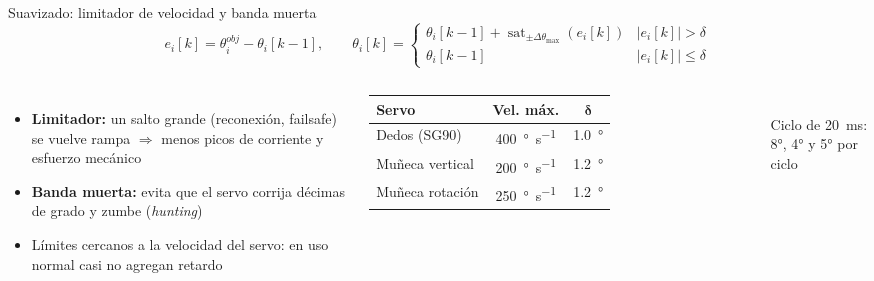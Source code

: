 \documentclass[aspectratio=169,10pt]{beamer}
\begin{document}
\begin{frame}{Suavizado: limitador de velocidad y banda muerta}
  \[
    e_i[k] = \theta^{obj}_i - \theta_i[k-1], \qquad
    \theta_i[k] =
    \begin{cases}
      \theta_i[k-1] + \operatorname{sat}_{\pm\Delta\theta_{\max}}\!\left(e_i[k]\right) & |e_i[k]| > \delta \\
      \theta_i[k-1] & |e_i[k]| \leq \delta
    \end{cases}
  \]
  \begin{columns}[T]
    \begin{itemize}\small
      \item \textbf{Limitador:} un salto grande (reconexión, failsafe) se vuelve rampa $\Rightarrow$ menos picos de corriente y esfuerzo mecánico
      \item \textbf{Banda muerta:} evita que el servo corrija décimas de grado y zumbe (\textit{hunting})
      \item Límites cercanos a la velocidad del servo: en uso normal casi no agregan retardo
    \end{itemize}
    \centering\small
    \begin{tabular}{l c c}
      \toprule
      \textbf{Servo} & \textbf{Vel. máx.} & $\boldsymbol{\delta}$ \\
      \midrule
      Dedos (SG90) & \SI{400}{\degree\per\second} & \SI{1.0}{\degree} \\
      Muñeca vertical & \SI{200}{\degree\per\second} & \SI{1.2}{\degree} \\
      Muñeca rotación & \SI{250}{\degree\per\second} & \SI{1.2}{\degree} \\
      \bottomrule
    \end{tabular}\\
    {\scriptsize Ciclo de \SI{20}{\milli\second}: 8°, 4° y 5° por ciclo}
  \end{columns}
\end{frame}
\end{document}
